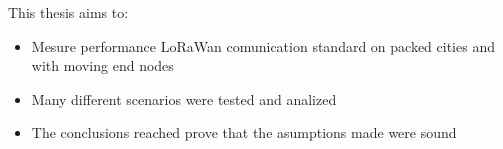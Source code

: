 

\begin{abstracts}

This thesis aims to:
\begin{itemize}
    \item Mesure performance LoRaWan comunication standard on packed cities and with moving end nodes
    \item Many different scenarios were tested and analized
    \item The conclusions reached prove that the asumptions made were sound
\end{itemize}

\end{abstracts}
